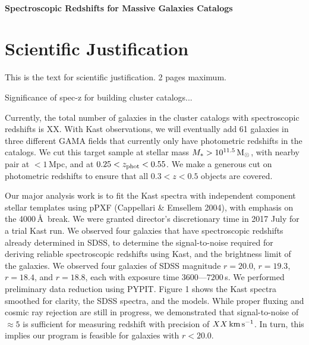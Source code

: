 \documentclass[letterpaper,12pt,dvips]{article}
\begin{document}
\\[-1cm]
\begin{center}
\bf\Large
Spectroscopic Redshifts for Massive Galaxies Catalogs 
\end{center}

\section{Scientific Justification} 

This is the text for scientific justification. 2 pages maximum. 

Significance of spec-z for building cluster catalogs...

Currently, the total number of galaxies in the cluster catalogs with spectroscopic redshifts is 
XX. With Kast observations, we will eventually add 61 galaxies in three different GAMA fields that 
currently only have photometric redshifts in the catalogs. We cut this target sample at stellar 
mass $M_*>10^{11.5}\,{\rm M}_\odot$, with nearby pair at $<1$\,Mpc, and at 
$0.25<z_{\rm phot}<0.55$. We make a generous cut on photometric redshifts to ensure that all 
$0.3 < z < 0.5$ objects are covered. 

Our major analysis work is to fit the Kast spectra with independent component stellar templates 
using pPXF (Cappellari \& Emsellem 2004), with emphasis on the 4000\,\AA\ break. We were granted 
director's discretionary time in 2017 July for a trial Kast run. We observed four galaxies that 
have spectroscopic redshifts already determined in SDSS, to determine the signal-to-noise required 
for deriving reliable spectroscopic redshifts using Kast, and the brightness limit of the 
galaxies. We observed four galaxies of SDSS magnitude $r=20.0$, $r=19.3$, $r=18.4$, and $r=18.8$, 
each with exposure time $3600\textrm{---}7200$\,s. We performed preliminary data reduction using 
PYPIT. Figure 1 shows the Kast spectra smoothed for clarity, the SDSS spectra, and the models. 
While proper fluxing and cosmic ray rejection are still in progress, we demonstrated that 
signal-to-noise of $\approx5$ is sufficient for measuring redshift with precision of 
$XX\,{\rm km\,s^{-1}}$. In turn, this implies our program is feasible for galaxies with $r<20.0$. 

\clearpage
\end{document}
